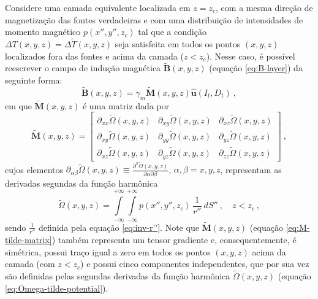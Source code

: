 Considere uma camada equivalente localizada em $z = z_{c}$, com a mesma direção de magnetização 
das fontes verdadeiras e com uma distribuição de intensidades de momento magnético $p(x'', y'', z_{c})$
tal que a condição $\Delta T(x, y, z) = \Delta \tilde{T}(x, y, z)$ seja satisfeita em todos os pontos 
$(x, y, z)$ localizados fora das fontes e acima da camada ($z < z_{c}$).
Nesse caso, é possível reescrever o campo de indução magnética $\tilde{\mathbf{B}}(x, y, z)$
(equação \ref{eq:B-layer}) da seguinte forma:
\begin{equation}
\tilde{\mathbf{B}}(x, y, z) = \gamma_{m} \tilde{\mathbf{M}}(x, y, z) \hat{\mathbf{u}}(I_{t}, D_{t}) \: ,
\label{eq:B-layer-alternative}
\end{equation}
em que $\tilde{\mathbf{M}}(x, y, z)$ é uma matriz dada por
\begin{equation}
	\tilde{\mathbf{M}}(x, y, z) = \begin{bmatrix}
		\partial_{xx} \tilde{\Omega}(x, y, z) & 
		\partial_{xy} \tilde{\Omega}(x, y, z) &
		\partial_{xz} \tilde{\Omega}(x, y, z) \\
		\partial_{xy} \tilde{\Omega}(x, y, z) & 
		\partial_{yy} \tilde{\Omega}(x, y, z) &
		\partial_{yz} \tilde{\Omega}(x, y, z) \\
		\partial_{xz} \tilde{\Omega}(x, y, z) & 
		\partial_{yz} \tilde{\Omega}(x, y, z) &
		\partial_{zz} \tilde{\Omega}(x, y, z)
	\end{bmatrix} \: ,
	\label{eq:M-tilde-matrix}
\end{equation}
cujos elementos $\partial_{\alpha\beta} \tilde{\Omega}(x, y, z) \equiv 
\frac{\partial^{2} \tilde{\Omega}(x, y, z)}{\partial \alpha \partial \beta}$, 
$\alpha, \beta = x, y, z$, representam as derivadas segundas da função harmônica 
\begin{equation}
\tilde{\Omega}(x, y, z) = \int\limits_{-\infty}^{+\infty}\int\limits_{-\infty}^{+\infty} 
p(x'', y'', z_{c}) \, \frac{1}{r''} \: dS'' \: , \quad z < z_{c} \: ,
\label{eq:Omega-tilde-potential}
\end{equation}
sendo $\frac{1}{r''}$ definida pela equação \ref{eq:inv-r''}.
Note que $\tilde{\mathbf{M}}(x, y, z)$ (equação \ref{eq:M-tilde-matrix}) também representa um tensor gradiente 
\citep{pedersen_rasmussen1990} e, consequentemente, é simétrica, possui traço igual a zero em todos os pontos 
$(x,y,z)$ acima da camada (com $z < z_{c}$) e possui cinco componentes independentes, que por sua vez são 
definidas pelas segundas derivadas da função harmônica 
$\tilde{\Omega}(x, y, z)$ (equação \ref{eq:Omega-tilde-potential}).
